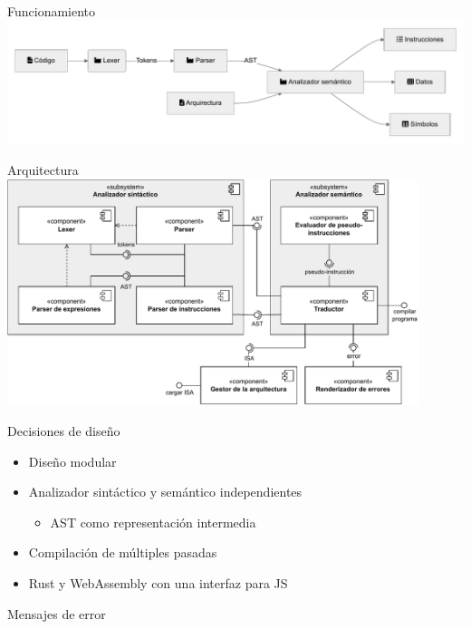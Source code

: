 \documentclass{beamer}
\newcommand{\svgfigure}[2][.8] {

}
\begin{document}
    \begin{frame}{Funcionamiento}
        \centering
        \includegraphics[width=1\textwidth]{funcionamiento}
    \end{frame}

    \begin{frame}{Arquitectura}
        \centering
        \includegraphics[width=0.9\textwidth]{components}
    \end{frame}

    \begin{frame}{Decisiones de diseño}
        \begin{itemize}
            \item Diseño modular
            \item Analizador sintáctico y semántico independientes
            \begin{itemize}
                \item AST como representación intermedia
            \end{itemize}
            \item Compilación de múltiples pasadas
            \item Rust y WebAssembly con una interfaz para JS
        \end{itemize}
    \end{frame}

    \begin{frame}{Mensajes de error}
        \begin{columns}
            \centering
            \svgfigure[1]{eval/1-new}
            \centering
            \svgfigure[1]{eval/3-new}
        \end{columns}
    \end{frame}
\end{document}
